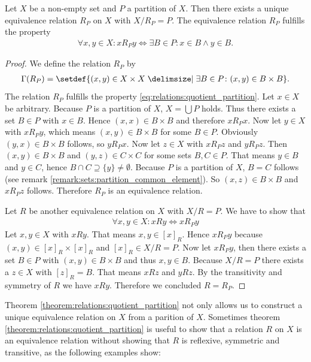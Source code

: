 \begin{theorem}\label{theorem:relations:quotient_partition}
    Let $X$ be a non-empty set and $P$ a partition of $X$. Then there exists a unique equivalence relation $R_P$ on $X$ with $X/R_P=P$. The equivalence relation $R_P$ fulfills the property \begin{align}\forall x,y\in X\colon x R_P y\Leftrightarrow \exists B\in P\colon x\in B\land y\in B.\label{eq:relations:quotient_partition}\end{align}
\end{theorem}
\begin{proof}
     We define the relation $R_P$ by \begin{align}\Gamma(R_P)=\setdef{(x,y)\in X\times X\given \exists B\in P\colon (x,y)\in B\times B}.\end{align}
    The relation $R_P$ fulfills the property \eqref{eq:relations:quotient_partition}. Let $x\in X$ be arbitrary. Because $P$ is a partition of $X$, $X=\bigcup P$ holds. Thus there exists a set $B\in P$ with $x\in B$. Hence $(x,x)\in B\times B$ and therefore $x R_P x$. Now let $y\in X$ with $x R_P y$, which means $(x,y)\in B\times B$ for some $B\in P$. Obviously $(y,x)\in B\times B$ follows, so $y R_P x$. Now let $z\in X$ with $x R_P z$ and $y R_P z$. Then $(x,y)\in B\times B$ and $(y,z)\in C\times C$ for some sets $B,C\in P$. That means $y\in B$ and $y\in C$, hence $B\cap C\supseteq\{y\}\neq\emptyset$. Because $P$ is a partition of $X$, $B=C$ follows (see remark \ref{remark:sets:partition_common_element}). So $(x,z)\in B\times B$ and $x R_P z$ follows. Therefore $R_P$ is an equivalence relation.

     Let $R$ be another equivalence relation on $X$ with $X/R=P$. We have to show that \begin{align}\forall x,y\in X\colon x R y\Leftrightarrow x R_P y\end{align}
    \proofright Let $x,y\in X$ with $x R y$. That means $x,y\in[x]_R$. Hence $x R_P y$ because $(x,y)\in [x]_R\times [x]_R$ and $[x]_R\in X/R=P$. \proofleft Now let $x R_P y$, then there exists a set $B\in P$ with $(x,y)\in B\times B$ and thus $x,y\in B$. Because $X/R=P$ there exists a $z\in X$ with $[z]_R=B$. That means $x R z$ and $y R z$. By the transitivity and symmetry of $R$ we have $x R y$. Therefore we concluded $R=R_P$.
\end{proof}

Theorem \ref{theorem:relations:quotient_partition} not only allows us to construct a unique equivalence relation on $X$ from a parition of $X$. Sometimes theorem \ref{theorem:relations:quotient_partition} is useful to show that a relation $R$ on $X$ is an equivalence relation without showing that $R$ is reflexive, symmetric and transitive, as the following examples show:

